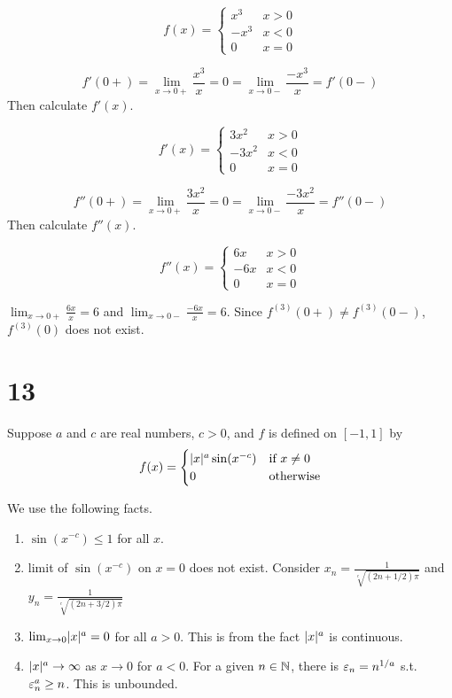 \documentclass{article}
\begin{document}
\[
f(x)=
\begin{cases}
x^3 & x>0 \\
-x^3 & x<0 \\
0 & x=0
\end{cases}
\]

\[f'(0+)=\lim_{x\to 0+} \frac{x^3}{x} = 0 = \lim_{x \to 0-} \frac{-x^3}{x} = f'(0-) \] Then calculate $f'(x)$.

\[
f'(x)=
\begin{cases}
3x^2 & x>0 \\
-3x^2 & x<0 \\
0 & x=0
\end{cases}
\]

\[f''(0+)=\lim_{x\to 0+} \frac{3x^2}{x} = 0 = \lim_{x \to 0-} \frac{-3x^2}{x} = f''(0-) \] Then calculate $f''(x)$.

\[
f''(x)=
\begin{cases}
6x & x>0 \\
-6x & x<0 \\
0 & x=0
\end{cases}
\]

$\lim_{x \to 0+} \frac{6x}{x} = 6$ and $\lim_{x \to 0-} \frac{-6x}{x}=6$. Since $f^{(3)}(0+) \neq f^{(3)}(0-)$, $f^{(3)}(0)$ does not exist.

\section*{13}

\begin{problem}
Suppose $a$ and $c$ are real numbers, $c > 0$, and $f$ is defined on $[-1,1]$ by \[f(x)=
\begin{cases}
\lvert x\rvert^a \sin(x^{-c}) & \text{if } x \neq 0 \\
0 & \text{otherwise}
\end{cases}
\]
\end{problem}

We use the following facts.

\begin{enumerate}
    \item $\sin(x^{-c}) \leq 1$ for all $x$.
    \item limit of $\sin(x^{-c})$ on $x=0$ does not exist. Consider $x_n = \frac{1}{\sqrt[c]{(2n+1/2)\pi}}$ and $y_n = \frac{1}{\sqrt[c]{(2n+3/2)\pi}}$
    \item $\lim_{x \to 0} \lvert x\rvert^a = 0$ for all $a > 0$. This is from the fact $\lvert x\rvert^a$ is continuous.
    \item $\lvert x\rvert^a \to \infty$ as $x \to 0$ for $a < 0$. For a given $n \in \mathbb{N}$, there is $\varepsilon_n=n^{1/a}$ s.t. $\varepsilon_n^a \geq n$. This is unbounded.
\end{enumerate}
\end{document}

